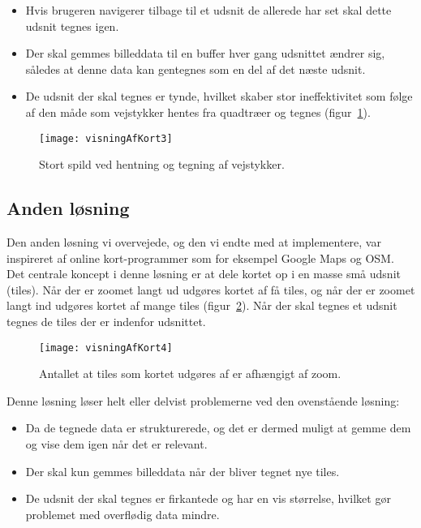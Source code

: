 \begin{itemize}
	\item Hvis brugeren navigerer tilbage til et udsnit de allerede har set skal dette udsnit tegnes igen.
	\item Der skal gemmes billeddata til en buffer hver gang udsnittet ændrer sig, således at denne data kan gentegnes som en del af det næste udsnit.
	\item De udsnit der skal tegnes er tynde, hvilket skaber stor ineffektivitet som følge af den måde som vejstykker hentes fra quadtræer og tegnes (figur~\ref{figur:visningAfKort3}).
\end{itemize}

\begin{figure}[h]
	\centering
	\texttt{[image: visningAfKort3]}
	\captionsetup{width=0.8\textwidth}
	\caption{Stort spild ved hentning og tegning af vejstykker.}
	\label{figur:visningAfKort3}
\end{figure}

\subsection{Anden løsning}
\label{subsec:andenLoesning}

Den anden løsning vi overvejede, og den vi endte med at implementere, var inspireret af online kort-programmer som for eksempel Google Maps og OSM. Det centrale koncept i denne løsning er at dele kortet op i en masse små udsnit (tiles). Når der er zoomet langt ud udgøres kortet af få tiles, og når der er zoomet langt ind udgøres kortet af mange tiles (figur~\ref{figur:visningAfKort4}). Når der skal tegnes et udsnit tegnes de tiles der er indenfor udsnittet.

\begin{figure}[h]
	\centering
	\texttt{[image: visningAfKort4]}
	\captionsetup{width=0.8\textwidth}
	\caption{Antallet at tiles som kortet udgøres af er afhængigt af zoom.}
	\label{figur:visningAfKort4}
\end{figure}

Denne løsning løser helt eller delvist problemerne ved den ovenstående løsning:

\begin{itemize}
	\item Da de tegnede data er strukturerede, og det er dermed muligt at gemme dem og vise dem igen når det er relevant.
	\item Der skal kun gemmes billeddata når der bliver tegnet nye tiles.
	\item De udsnit der skal tegnes er firkantede og har en vis størrelse, hvilket gør problemet med overflødig data mindre.
\end{itemize}


